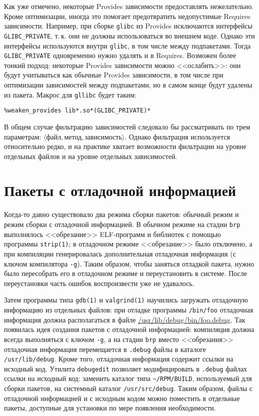 \documentclass[russian,a4paper,12pt,titlepage]{article}
\begin{document}
Как уже отмечено, некоторые Provides зависимости предоставлять нежелательно.  Кроме оптимизации, иногда это помогает
предотвратить недопустимые Requires зависимости.  Например, при сборке \verb|glibc| из Provides исключаются интерфейсы
\verb|GLIBC_PRIVATE|, т.\,к. они не должны использоваться во внешнем коде.
Однако эти интерфейсы используются внутри \verb|glibc|, в том числе между подпакетами.  Тогда
\verb|GLIBC_PRIVATE| одновременно нужно удалять и в Requires.  Возможен более тонкий подход: некоторые Provides зависимости
можно <<ослабить>>: они будут учитываться как обычные Provides зависимости, в том числе при оптимизации зависимостей между
подпакетами, но в самом конце будут удалены из пакета.  Макрос для \verb|gllibc| будет таким:
\begin{verbatim}
%weaken_provides lib*.so*(GLIBC_PRIVATE)*
\end{verbatim}

В общем случае фильтрацию зависимостей следовало бы рассматривать по трем параметрам:
$\langle\textit{файл},\textit{метод},\textit{зависимость}\rangle$.  Однако фильтрация используется относительно редко,
и на практике хватает возможности фильтрации на уровне отдельных файлов и на уровне отдельных зависимостей.

\section{Пакеты с отладочной информацией}
\label{debuginfo-packages}
Когда-то давно существовало два режима сборки пакетов: обычный режим и режим сборки с отладочной информацией.
В обычном режиме на стадии \verb|brp| выполнялось <<обрезание>> ELF-программ и библиотек с помощью программы \verb|strip(1)|;
в отладочном режиме <<обрезание>> было отключено, а при компиляции генерировалась дополнительная отладочная информация (с ключом
компилятора \verb|-g|).  Таким образом, чтобы заняться отладкой пакета, нужно было пересобрать его в отладочном режиме и переустановить
в системе.  После переустановки часть ошибок воспроизвести уже не удавалось.

Затем программы типа \verb|gdb(1)| и \verb|valgrind(1)| научились загружать отладочную информацию из отдельных файлов:
при отладке программы \verb|/bin/foo| отладочная информация должна располагаться в файле \url{/usr/lib/debug/bin/foo.debug}.
Так появилась идея создания пакетов с отладочной информацией: компиляция должна всегда выполняться с ключом \verb|-g|,
а на стадии \verb|brp| вместо <<обрезания>> отладочная информация перемещается в \verb|.debug| файлы
в каталоге \verb|/usr/lib/debug|.  Кроме того, отладочная информация содержит ссылки на исходный код.
Утилита \verb|debugedit| позволяет модифицировать в \verb|.debug| файлах ссылки на исходный код: заменить каталог
типа \verb|~/RPM/BUILD|, используемый для сборки пакетов, на системный каталог \verb|/usr/src/debug|.  Таким образом,
файлы с отладочной информацией и с исходным кодом можно поместить в отдельные пакеты, доступные для установки
по мере появления необходимости.
\end{document}

